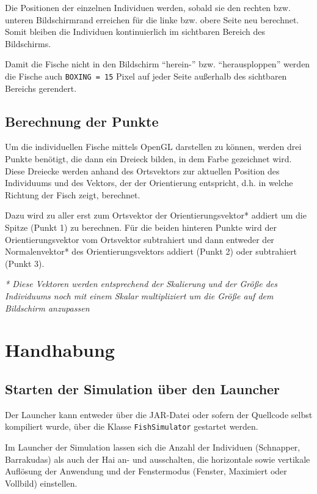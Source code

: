 \documentclass[11pt]{article}
\begin{document}
\vspace{0.5em}
Die Positionen der einzelnen Individuen werden, sobald sie den rechten bzw. unteren Bildschirmrand erreichen für die linke bzw. obere Seite neu berechnet. Somit bleiben die Individuen kontinuierlich im sichtbaren Bereich des Bildschirms.

\vspace{0.5em}
Damit die Fische nicht in den Bildschirm ``herein-'' bzw. ``herausploppen'' werden die Fische auch \lstinline{BOXING = 15} Pixel auf jeder Seite außerhalb des sichtbaren Bereichs gerendert.
\subsection{Berechnung der Punkte}
Um die individuellen Fische mittels OpenGL darstellen zu können, werden drei Punkte benötigt, die dann ein Dreieck bilden, in dem Farbe gezeichnet wird. Diese Dreiecke werden anhand des Ortsvektors zur aktuellen Position des Individuums und des Vektors, der der Orientierung entspricht, d.h. in welche Richtung der Fisch zeigt, berechnet.

\vspace{0.5em}
Dazu wird zu aller erst zum Ortsvektor der Orientierungsvektor* addiert um die Spitze (Punkt 1) zu berechnen. Für die beiden hinteren Punkte wird der Orientierungsvektor vom Ortsvektor subtrahiert und dann entweder der Normalenvektor* des Orientierungsvektors addiert (Punkt 2) oder subtrahiert (Punkt 3).

\vspace{0.5em}
\textit{* Diese Vektoren werden entsprechend der Skalierung und der Größe des Individuums noch mit einem Skalar multipliziert um die Größe auf dem Bildschirm anzupassen}


\section{Handhabung}
\subsection{Starten der Simulation über den Launcher}
Der Launcher kann entweder über die JAR-Datei oder sofern der Quellcode selbst kompiliert wurde, über die Klasse \lstinline{FishSimulator} gestartet werden.

\vspace{0.5em}
Im Launcher der Simulation lassen sich die Anzahl der Individuen (Schnapper, Barrakudas) als auch der Hai an- und ausschalten, die horizontale sowie vertikale Auflösung der Anwendung und der Fenstermodus (Fenster, Maximiert oder Vollbild) einstellen.
\end{document}
